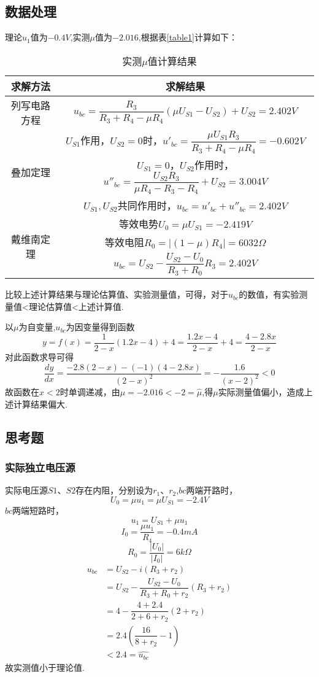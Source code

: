 \documentclass[12pt,a4paper,oneside,left=3.18,right=3.18,top=2.54,bottom=2.54]{ctexart}
\begin{document}
	\subsection{数据处理}
	理论$u_1$值为$-0.4V$,实测$\mu$值为$-2.016$,根据表\ref{table1}计算如下：
		\begin{table}[H]
		\centering
		\begin{tabular}{|c|c|}
		\hline
		求解方法&求解结果\\
		\hline
		列写电路方程&$u_{bc}=\dfrac{R_3}{R_3+R_4-\mu R_4}(\mu U_{S1}-U_{S2})+U_{S2}=2.402V$\\
		\hline
		\multirow{3}{*}{叠加定理}&$U_{S1}$作用，$U_{S2}=0$时，$u'_{bc}=\dfrac{\mu U_{S1}R_3}{R_3+R_4-\mu R_4}=-0.602V$\\
		\multirow{3}{*}{}&$U_{S1}=0$，$U_{S2}$作用时，$u''_{bc}=\dfrac{U_{S2}R_3}{\mu R_4-R_3-R_4}+U_{S2}=3.004V$\\
		\multirow{3}{*}{}&$U_{S1},U_{S2}$共同作用时，$u_{bc}=u'_{bc}+u''_{bc}=2.402V$\\
		\hline
		\multirow{3}{*}{戴维南定理}&等效电势$U_{0}=\mu U_{S1}=-2.419V$\\
		\multirow{3}{*}{}&等效电阻$R_{0}=|(1-\mu)R_4|=6032\Omega$\\
		\multirow{3}{*}{}&$u_{bc}=U_{S2}-\dfrac{U_{S2}-U_0}{R_3+R_0}R_3=2.402V$\\
		\hline
		\end{tabular}
		\caption{实测$\mu$值计算结果}
		\label{table4}
		\end{table}
		\par
		比较上述计算结果与理论估算值、实验测量值，可得，对于$u_{bc}$的数值，有实验测量值<理论估算值<上述计算值.\par
		\par
		以$\mu$为自变量,$u_{bc}$为因变量得到函数
		$$y=f(x)=\dfrac{1}{2-x}(1.2x-4)+4=\dfrac{1.2x-4}{2-x}+4=\dfrac{4-2.8x}{2-x}$$
		对此函数求导可得
		$$\dfrac{dy}{dx}=\dfrac{-2.8(2-x)-(-1)(4-2.8x)}{(2-x)^2}=-\dfrac{1.6}{(x-2)^2}<0$$
		故函数在$x<2$时单调递减，由$\mu=-2.016<-2=\hat{\mu}$,得$\mu$实际测量值偏小，造成上述计算结果偏大.
	\subsection{思考题}
		\subsubsection{实际独立电压源}
		实际电压源$S1$、$S2$存在内阻，分别设为$r_1$、$r_2$,$bc$两端开路时，
		$$U_0=\mu u_1=\mu U_{S1}=-2.4V$$
		$bc$两端短路时，
		$$u_1=U_{S1}+\mu u_1$$
		$$I_0=\dfrac{\mu u_1}{R_4}=-0.4mA$$
		$$R_0=\dfrac{|U_0|}{|I_0|}=6k\Omega$$
		\begin{align}
		u_{bc}
		&=U_{S2}-i(R_3+r_2)\nonumber\\
		&=U_{S2}-\dfrac{U_{S2}-U_0}{R_3+R_0+r_2}(R_3+r_2)\nonumber\\
		&=4-\dfrac{4+2.4}{2+6+r_2}(2+r_2)\nonumber\\
		&=2.4(\dfrac{16}{8+r_2}-1)\nonumber\\
		&<2.4=\hat{u_{bc}}\nonumber
		\end{align}
		故实测值小于理论值.
\end{document}
